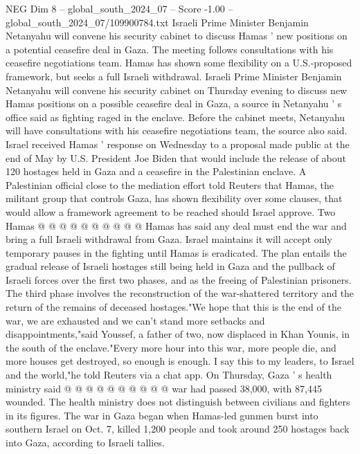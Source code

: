 \begin{textsample}{NEG Dim 8 – global\_south\_2024\_07 – Score -1.00 – global\_south\_2024\_07/109900784.txt}  \label{ex:f8_neg_110}
Israeli Prime Minister Benjamin Netanyahu will convene his security cabinet to discuss Hamas ' new positions on a potential ceasefire deal in Gaza.
The meeting follows consultations with his ceasefire negotiations team.
Hamas has shown some flexibility on a U.S.-proposed framework, but seeks a full Israeli withdrawal.
Israeli Prime Minister Benjamin Netanyahu will convene his security cabinet on Thursday evening to discuss new Hamas positions on a possible ceasefire deal in Gaza, a source in Netanyahu ' s office said as fighting raged in the enclave.
Before the cabinet meets, Netanyahu will have consultations with his ceasefire negotiations team, the source also said.
Israel received Hamas ' response on Wednesday to a proposal made public at the end of May by U.S.
President Joe Biden that would include the release of about 120 hostages held in Gaza and a ceasefire in the Palestinian enclave.
A Palestinian official close to the mediation effort told Reuters that Hamas, the militant group that controls Gaza, has shown flexibility over some clauses, that would allow a framework agreement to be reached should Israel approve.
Two Hamas @ @ @ @ @ @ @ @ @ @ Hamas has said any deal must end the war and bring a full Israeli withdrawal from Gaza.
Israel maintains it will accept only temporary pauses in the fighting until Hamas is eradicated.
The plan entails the gradual release of Israeli hostages still being held in Gaza and the pullback of Israeli forces over the first two phases, and as the freeing of Palestinian prisoners.
The third phase involves the reconstruction of the war-shattered territory and the return of the remains of deceased hostages."We hope that this is the end of the war, we are exhausted and we can't stand more setbacks and disappointments,"said Youssef, a father of two, now displaced in Khan Younis, in the south of the enclave."Every more hour into this war, more people die, and more houses get destroyed, so enough is enough.
I say this to my leaders, to Israel and the world,"he told Reuters via a chat app.
On Thursday, Gaza ' s health ministry said @ @ @ @ @ @ @ @ @ @ war had passed 38,000, with 87,445 wounded.
The health ministry does not distinguish between civilians and fighters in its figures.
The war in Gaza began when Hamas-led gunmen burst into southern Israel on Oct. 7, killed 1,200 people and took around 250 hostages back into Gaza, according to Israeli tallies.

\end{textsample}
